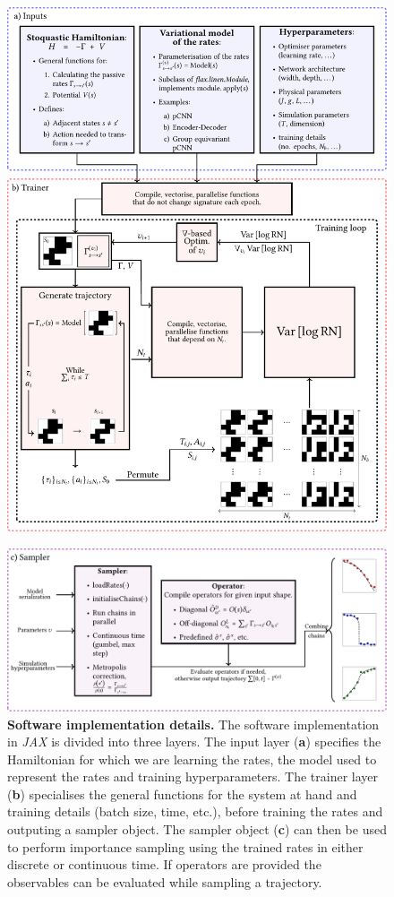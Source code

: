 \begin{enumerate}[label=\roman*)]
	\begin{figure}[H]
		\centering
		\includegraphics[width=\linewidth]{Chapter4/Figs/Vector/qsampl1}
	\end{figure}
	\begin{figure}[t!]
		\ContinuedFloat
		\centering
		\includegraphics[width=\linewidth]{Chapter4/Figs/Vector/qsampl2}
		\caption[Implementation details]{\textbf{Software implementation details.} The software implementation in \emph{JAX} is divided into three layers. The input layer (\textbf{a}) specifies the Hamiltonian for which we are learning the rates, the model used to represent the rates and training hyperparameters. The trainer layer (\textbf{b}) specialises the general functions for the system at hand and training details (batch size, time, etc.), before training the rates and outputing a sampler object. The sampler object (\textbf{c}) can then be used to perform importance sampling using the trained rates in either discrete or continuous time. If operators are provided the observables can be evaluated while sampling a trajectory.}

\end{figure}
\end{enumerate}
